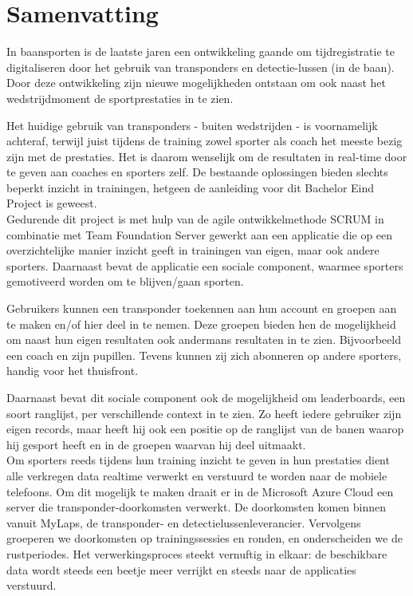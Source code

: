 \chapter*{Samenvatting}

In baansporten is de laatste jaren een ontwikkeling gaande om tijdregistratie te digitaliseren door het gebruik van transponders en detectie-lussen (in de baan). Door deze ontwikkeling zijn nieuwe mogelijkheden ontstaan om ook naast het wedstrijdmoment de sportprestaties in te zien.

Het huidige gebruik van transponders - buiten wedstrijden - is voornamelijk achteraf, terwijl juist tijdens de training zowel sporter als coach het meeste bezig zijn met de prestaties. Het is daarom wenselijk om de resultaten in real-time door te geven aan coaches en sporters zelf. De bestaande oplossingen bieden slechts beperkt inzicht in trainingen, hetgeen de aanleiding voor dit Bachelor Eind Project is geweest.\\

\noindent 
Gedurende dit project is met hulp van de agile ontwikkelmethode SCRUM in combinatie met Team Foundation Server gewerkt aan een applicatie die op een overzichtelijke manier inzicht geeft in trainingen van eigen, maar ook andere sporters. Daarnaast bevat de applicatie een sociale component, waarmee sporters gemotiveerd worden om te blijven/gaan sporten.

Gebruikers kunnen een transponder toekennen aan hun account en groepen aan te maken en/of hier deel in te nemen. Deze groepen bieden hen de mogelijkheid om naast hun eigen resultaten ook andermans resultaten in te zien. Bijvoorbeeld een coach en zijn pupillen. Tevens kunnen zij zich abonneren op andere sporters, handig voor het thuisfront.

Daarnaast bevat dit sociale component ook de mogelijkheid om leaderboards, een soort ranglijst, per verschillende context in te zien. Zo heeft iedere gebruiker zijn eigen records, maar heeft hij ook een positie op de ranglijst van de banen waarop hij gesport heeft en in de groepen waarvan hij deel uitmaakt.\\

\noindent
Om sporters reeds tijdens hun training inzicht te geven in hun prestaties dient alle verkregen data realtime verwerkt en verstuurd te worden naar de mobiele telefoons. Om dit mogelijk te maken draait er in de Microsoft Azure Cloud een server die transponder-doorkomsten verwerkt. De doorkomsten komen binnen vanuit MyLaps, de transponder- en detectielussenleverancier. Vervolgens groeperen we doorkomsten op trainingssessies en ronden, en onderscheiden we de rustperiodes. Het verwerkingsproces steekt vernuftig in elkaar: de beschikbare data wordt steeds een beetje meer verrijkt en steeds naar de applicaties verstuurd.

